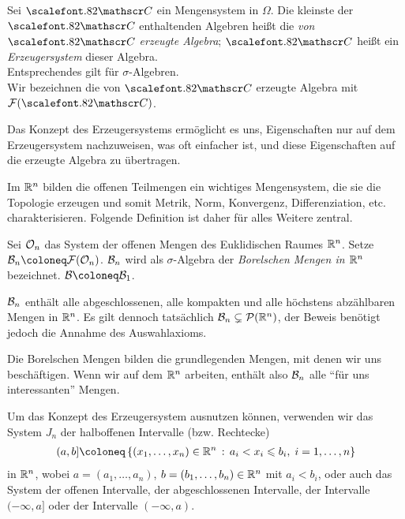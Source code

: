 \begin{defn}
\label{defn:1.3}
Sei $\CC$ ein Mengensystem in $\Omega$. Die kleinste der $\CC$ enthaltenden
Algebren heißt die \emph{von $\CC$ erzeugte Algebra}; $\CC$ heißt ein
\emph{Erzeugersystem} dieser Algebra.\\
Entsprechendes gilt für $\sigma$-Algebren.\\
Wir bezeichnen die von $\CC$ erzeugte Algebra mit $\FF(\CC)$.\fishhere
\end{defn}

Das Konzept des Erzeugersystems ermöglicht es uns, Eigenschaften nur auf dem
Erzeugersystem nachzuweisen, was oft einfacher ist, und diese Eigenschaften
auf die erzeugte Algebra zu übertragen.

Im $\mathbb{R}^n$ bilden die offenen Teilmengen ein wichtiges Mengensystem, die sie
die Topologie erzeugen und somit Metrik, Norm, Konvergenz, Differenziation,
etc. charakterisieren. Folgende Definition ist daher für alles Weitere zentral.

\begin{defn}
\label{defn:1.4}
Sei $\mathcal{O}_n$ das System der offenen Mengen des Euklidischen Raumes $\mathbb{R}^n$.
Setze $\BB_n \defl \FF(\OO_n)$. $\mathcal{B}_n$ wird als $\sigma$-Algebra der
\emph{Borelschen Mengen in $\mathbb{R}^n$} bezeichnet. $\BB\defl \BB_1$.\fishhere
\end{defn}

$\mathcal{B}_n$ enthält alle abgeschlossenen, alle kompakten und alle höchstens
abzählbaren Mengen in $\mathbb{R}^n$. Es gilt dennoch tatsächlich $\mathcal{B}_n\subsetneq
\mathcal{P}(\mathbb{R}^n)$, der Beweis benötigt jedoch die Annahme des Auswahlaxioms.

Die Borelschen Mengen bilden die grundlegenden Mengen, mit denen wir uns
beschäftigen. Wenn wir auf dem $\mathbb{R}^n$ arbeiten, enthält also $\mathcal{B}_n$ alle ``für
uns interessanten'' Mengen.


Um das Konzept des Erzeugersystem ausnutzen können, verwenden wir
das System $J_n$ der halboffenen Intervalle (bzw. Rechtecke)
\begin{align*}
(a,b]\defl\setdef{(x_1,\ldots,x_n)\in\R^n}{a_i < x_i\le b_i,\; i=1,\ldots,n}
\end{align*}
in $\mathbb{R}^n$, wobei $a=(a_1,\ldots,a_n)$, $b=(b_1,\ldots,b_n)\in\mathbb{R}^n$ mit $a_i <
b_i$, oder auch das System der offenen Intervalle, der abgeschlossenen
Intervalle, der Intervalle $(-\infty,a]$ oder der Intervalle $(-\infty,a)$.

